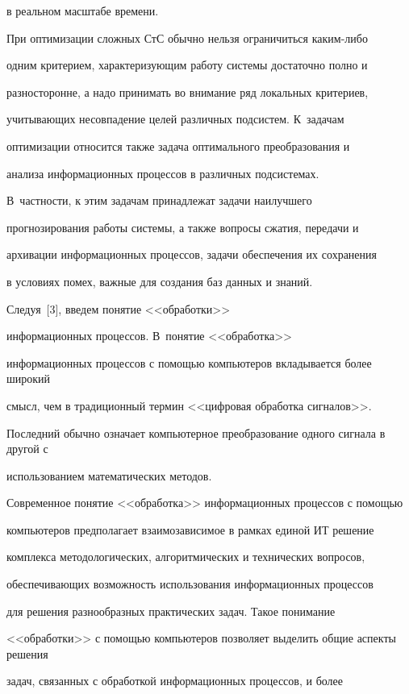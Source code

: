 в реальном масштабе времени.





При оптимизации сложных СтС обычно нельзя ограничиться ка\-ким-ли\-бо


одним критерием, характеризующим работу системы достаточно полно и


разносторонне, а надо принимать во внимание ряд локальных критериев,


учитывающих несовпадение целей различных подсистем. К~задачам


оптимизации относится также задача оптимального преобразования и


анализа информационных процессов в различных подсистемах. 


В~част\-ности, к этим задачам принадлежат задачи наилучшего


прогнозирования работы системы, а также вопросы сжатия, передачи и


архивации информационных процессов, задачи обеспечения их сохранения


в условиях помех, важные для создания баз данных и знаний.





Следуя~[3], введем понятие <<обработки>>


информационных процессов. В~понятие <<обработка>>


информационных процессов с помощью компьютеров вкладывается более широкий


смысл, чем в традиционный термин <<цифровая обработка сигналов>>.


Последний обычно означает компьютерное преобразование одного сигнала в другой с


использованием математических методов.


Современное понятие <<обработка>> информационных процессов с помощью


компьютеров предполагает взаимозависимое в рамках единой ИТ решение


комплекса методологических, алгоритмических и технических вопросов,


обеспечивающих возможность использования информационных процессов


для решения разнообразных практических задач. Такое понимание


<<обработки>> с помощью компьютеров позволяет выделить общие аспекты решения


задач, связанных с обработкой информационных процессов, и более


